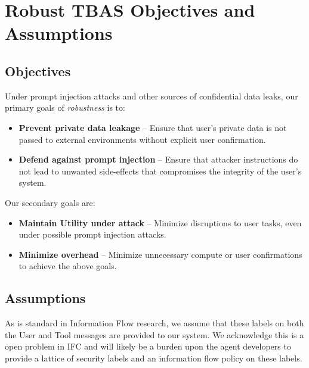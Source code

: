 \section{Robust TBAS Objectives and Assumptions}

\subsection{Objectives} Under prompt injection attacks and other sources of confidential data leaks, our primary goals of \textit{robustness} is to:
\begin{itemize}[noitemsep]
    \item \textbf{Prevent private data leakage} -- Ensure that user's private data is not passed to external environments without explicit user confirmation.
    \item \textbf{Defend against prompt injection} -- Ensure that attacker instructions do not lead to unwanted side-effects that compromises the integrity of the user's system.
\end{itemize}
Our secondary goals are:
\begin{itemize}[noitemsep]
\item \textbf{Maintain Utility under attack} -- Minimize disruptions to user tasks, even under possible prompt injection attacks.
\item \textbf{Minimize overhead} -- Minimize unnecessary compute or user confirmations to achieve the above goals.
\end{itemize}

\subsection{Assumptions} 
\label{subsec:robust_tbas_assumptions}
As is standard in Information Flow research, we assume that these labels on both the User and Tool messages are provided to our system. We acknowledge this is a open problem in IFC and  will likely be a burden upon the agent developers to provide a lattice of security labels and an information flow policy on these labels.

